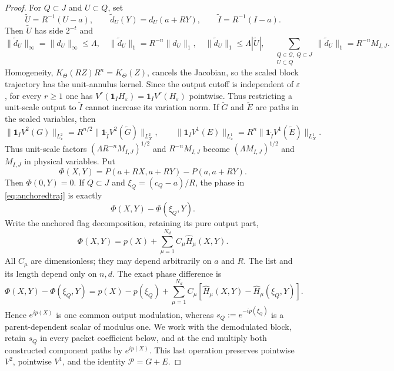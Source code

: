 \documentclass[11pt]{article}
\numberwithin{equation}{section}
\theoremstyle{remark}
\theoremstyle{definition}
\newcommand{\norm}[1]{\lVert #1\rVert}
\begin{document}
\begin{proof}
For $Q\subset J$ and $U\subset Q$, set
\[
 \widetilde U=R^{-1}(U-a),\qquad
 \widetilde d_U(Y)=d_U(a+RY),\qquad
 \widetilde I=R^{-1}(I-a).
\]
Then $\widetilde U$ has side $2^{-t}$ and
\begin{equation}\label{eq:packet-rescaling-data}
 \norm{\widetilde d_U}_\infty=\norm{d_U}_\infty\le\Lambda,
 \quad
 \norm{\widetilde d_U}_1=R^{-n}\norm{d_U}_1,
 \quad
 \norm{\widetilde d_U}_1\le\Lambda|\widetilde U|,
 \quad
 \sum_{\substack{Q\in\mathcal Q,\ Q\subset J\\U\subset Q}}
       \norm{\widetilde d_U}_1=R^{-n}M_{I,J}.
\end{equation}
Homogeneity, $K_\Theta(RZ)R^n=K_\Theta(Z)$, cancels the Jacobian, so the
scaled block trajectory has the unit-annulus kernel.  Since the output
cutoff is independent of $\varepsilon$, for every $r\ge1$ one has
$V^r(\mathbf1_IH_\varepsilon)=\mathbf1_I V^r(H_\varepsilon)$ pointwise.
Thus restricting a unit-scale output to $\widetilde I$ cannot increase its
variation norm.  If $\widetilde G$ and $\widetilde E$ are paths in the
scaled variables, then
\begin{equation}\label{eq:packet-rescaling-output}
 \norm{\mathbf1_I V^2(G)}_{L_x^2}
 =R^{n/2}\norm{\mathbf1_{\widetilde I}V^2(\widetilde G)}_{L_X^2},
 \qquad
 \norm{\mathbf1_I V^1(E)}_{L_x^1}
 =R^n\norm{\mathbf1_{\widetilde I}V^1(\widetilde E)}_{L_X^1}.
\end{equation}
Thus unit-scale factors
$(\Lambda R^{-n}M_{I,J})^{1/2}$ and $R^{-n}M_{I,J}$ become
$(\Lambda M_{I,J})^{1/2}$ and $M_{I,J}$ in physical variables.
Put
\[
 \Phi(X,Y)=P(a+RX,a+RY)-P(a,a+RY).
\]
Then $\Phi(0,Y)=0$.  If $Q\subset J$ and
$\xi_Q=(c_Q-a)/R$, the phase in \eqref{eq:anchoredtraj} is exactly
\begin{equation}\label{eq:blockphase}
 \Phi(X,Y)-\Phi(\xi_Q,Y).
\end{equation}
Write the anchored flag decomposition, retaining its pure output part,
\begin{equation}\label{eq:blockflag}
 \Phi(X,Y)=p(X)+\sum_{\mu=1}^{N_d} C_\mu\widehat H_\mu(X,Y).
\end{equation}
All $C_\mu$ are dimensionless; they may depend arbitrarily on $a$ and $R$.
The list and its length depend only on $n,d$.  The exact phase difference
is
\begin{equation}\label{eq:block-output-scalar}
 \Phi(X,Y)-\Phi(\xi_Q,Y)
 =p(X)-p(\xi_Q)
  +\sum_{\mu=1}^{N_d}C_\mu
   [\widehat H_\mu(X,Y)-\widehat H_\mu(\xi_Q,Y)].
\end{equation}
Hence $e^{ip(X)}$ is one common output modulation, whereas
$s_Q:=e^{-ip(\xi_Q)}$ is a parent-dependent scalar of modulus one.  We
work with the demodulated block, retain $s_Q$ in every packet coefficient
below, and at the end multiply both constructed component paths by
$e^{ip(X)}$.  This last operation preserves pointwise $V^2$, pointwise
$V^1$, and the identity $\mathcal P=G+E$.


\end{proof}
\end{document}
